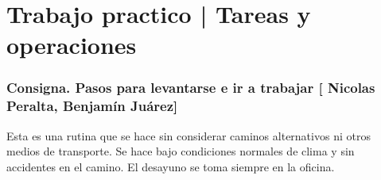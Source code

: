 \documentclass[]{article}
\date{}
\begin{document}
\section*{Trabajo practico | Tareas y operaciones}


\subsubsection*{%
Consigna. Pasos para levantarse e ir a trabajar [%
Nicolas Peralta, Benjamín Juárez]}

Esta es una rutina que se hace %
sin considerar caminos alternativos ni otros medios de transporte.
Se hace bajo condiciones normales de clima y sin accidentes en el camino.
El desayuno se toma siempre en la oficina.

\begin{enumerate}
\def\labelenumi{\arabic{enumi}.}






\end{enumerate}
\end{document}
